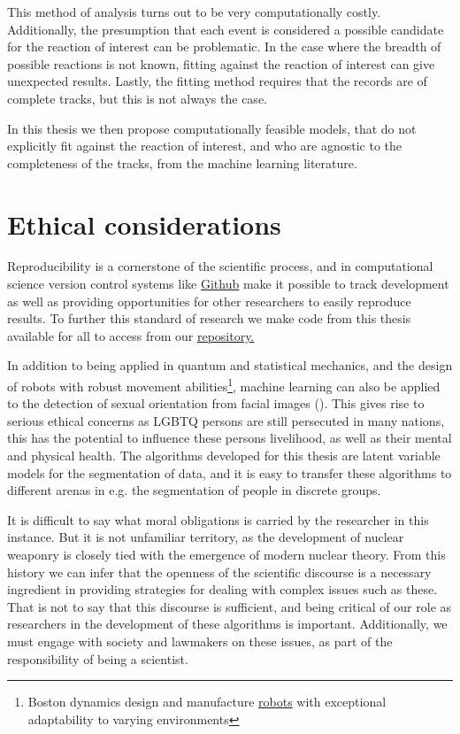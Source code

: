This method of analysis turns out to be very computationally costly. Additionally, the presumption that each event is considered a possible candidate for the reaction of interest can be problematic. In the case where the breadth of possible reactions is not known, fitting against the reaction of interest can give unexpected results. Lastly, the fitting method requires that the records are of complete tracks, but this is not always the case.

In this thesis we then propose computationally feasible models, that do not explicitly fit against the reaction of interest, and who are agnostic to the completeness of the tracks, from the machine learning literature.

\section{Ethical considerations}

Reproducibility is a cornerstone of the scientific process, and in computational science version control systems like \href{https://github.com/}{Github} make it possible to track development as well as providing opportunities for other researchers to easily reproduce results. To further this standard of research we make code from this thesis available for all to access from our \href{https://github.com/ATTPC/VAE-event-classification}{repository.} 

In addition to being applied in quantum and statistical mechanics, and the design of robots with robust movement abilities\footnote{Boston dynamics design and manufacture \href{https://www.youtube.com/watch?v=LikxFZZO2sk}{robots} with exceptional adaptability to varying environments}, machine learning can also be applied to the detection of sexual orientation from facial images (\citet{Wang2018}). This gives rise to serious ethical concerns as LGBTQ persons are still persecuted in many nations, this has the potential to influence these persons livelihood, as well as their mental and physical health. The algorithms developed for this thesis are latent variable models for the segmentation of data, and it is easy to transfer these algorithms to different arenas in e.g. the segmentation of people in discrete groups.

It is difficult to say what moral obligations is carried by the researcher in this instance. But it is not unfamiliar territory, as the development of nuclear weaponry is closely tied with the emergence of modern nuclear theory. From this history we can infer that the openness of the scientific discourse is a necessary ingredient in providing strategies for dealing with complex issues such as these. That is not to say that this discourse is sufficient, and being critical of our role as researchers in the development of these algorithms is important. Additionally, we must engage with society and lawmakers on these issues, as part of the responsibility of being a scientist. 

